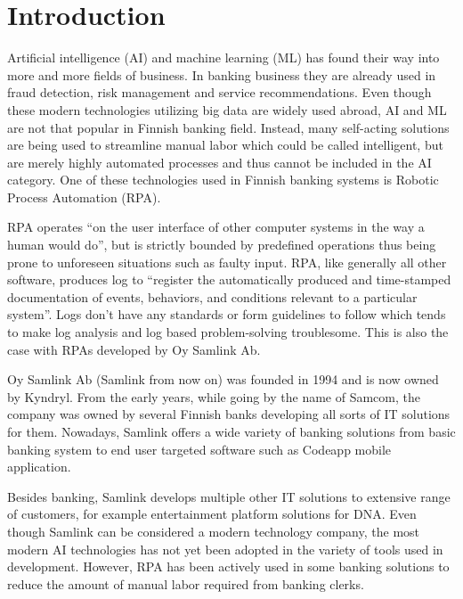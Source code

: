 

\section{Introduction}\label{sec:introduction}

\thispagestyle{empty}

Artificial intelligence (AI) and machine learning (ML)
has found their way into
more and more fields of business.
In banking business they are already used in
fraud detection, risk management and service recommendations.\cite{donepudi2017machine}
Even though these
modern technologies utilizing big data
are widely used abroad,
AI and ML are not that popular in Finnish banking field.
Instead,
many self-acting solutions are being used
to streamline manual labor
which could be called intelligent,
but are merely highly automated processes
and thus cannot be included in the AI category.
One of these technologies used in Finnish banking systems
is Robotic Process Automation (RPA).

RPA operates \enquote{on the user interface of other computer systems
in the way a human would do},\cite{van2018robotic}
but is strictly bounded by predefined operations
thus being prone to unforeseen situations
such as faulty input.
RPA, like generally all other software,
produces log to \enquote{register
the automatically produced and time-stamped documentation
of events, behaviors, and conditions
relevant to a particular system}\cite{delarosa2018log}.
Logs don't have any standards or form guidelines to follow
which tends to make
log analysis and log based problem-solving troublesome.
This is also the case with RPAs developed by Oy Samlink Ab.

Oy Samlink Ab (Samlink from now on)
was founded in 1994
and is now owned by Kyndryl.
From the early years,
while going by the name of Samcom,
the company was owned by several Finnish banks
developing all sorts of IT solutions for them.
Nowadays,
Samlink offers a wide variety of banking solutions
from basic banking system to end user targeted software
such as Codeapp mobile application.

Besides banking,
Samlink develops multiple other IT solutions
to extensive range of customers,
for example
entertainment platform solutions for DNA\@.
Even though Samlink can be considered
a modern technology company,
the most modern AI technologies has not yet been adopted
in the variety of tools used in development.
However,
RPA has been actively used
in some banking solutions
to reduce the amount of manual labor required
from banking clerks.

